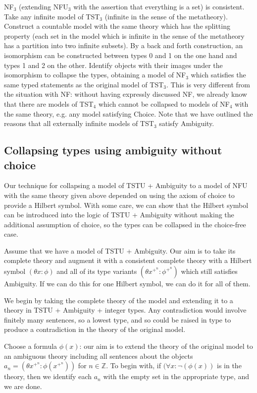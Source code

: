 \documentclass[12pt]{article}
\begin{document}
NF$_3$ (extending NFU$_3$ with the assertion that everything is a set) is consistent.   Take any infinite model of TST$_3$ (infinite in the sense of the metatheory).   Construct a countable model with the same theory which has the splitting property (each set in the model which is infinite in the sense of the metatheory has a partition into two infinite subsets).  By a back and forth construction, an isomorphism can be constructed between types 0 and 1 on the one hand and types 1 and 2 on the other.  Identify
objects with their images under the isomorphism to collapse the types, obtaining a model of NF$_3$ which satisfies the same typed statements as the original model of TST$_3$.  This is very different from the situation with 
NF:  without having expressly discussed NF, we already know that there are models of TST$_4$ which cannot be collapsed to models of NF$_4$ with the same theory, e.g. any model satisfying Choice.  Note that we have outlined the reasons
that all externally infinite models of TST$_3$ satisfy Ambiguity.

\subsection{Collapsing types using ambiguity without choice}

Our technique for collapsing a model of TSTU + Ambiguity to a model of NFU with the same theory given above depended on using the axiom of choice to provide a Hilbert symbol.  With some care, we can show that
the Hilbert symbol can be introduced into the logic of TSTU + Ambiguity without making the additional assumption of choice, so the types can be collapsed in the choice-free case.

Assume that we have a model of TSTU + Ambiguity.  Our aim is to take its complete theory and augment it with a consistent complete theory with a Hilbert symbol $(\theta x:\phi)$ and all of its type
variants $(\theta x^{+^n}:\phi^{+^n})$ which still satisfies Ambiguity.  If we can do this for one Hilbert symbol, we can do it for all of them.

We begin by taking the complete theory of the model and extending it to a theory in TSTU + Ambiguity + integer types.   Any contradiction would involve finitely many sentences, so a lowest type, and so could be raised in type
to produce a contradiction in the theory of the original model.

Choose a formula $\phi(x)$:  our aim is to extend the theory of the original model to an ambiguous theory including all sentences about the objects $a_n = (\theta x^{+^n}:\phi(x^{+^n}))$ for $n \in \mathbb Z$.  To begin with,
if $(\forall x:\neg(\phi(x))$ is in the theory, then we identify each $a_n$ with the empty set in the appropriate type, and we are done.
\end{document}
